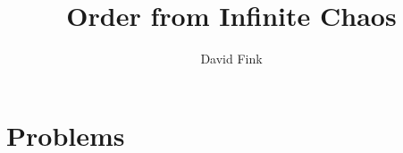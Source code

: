 \documentclass[11pt]{article}
\begin{document}
\title{Order from Infinite Chaos}
\author{David Fink}
\maketitle{}


\section*{Problems}

\newcommand{\src}{\tmpdir/my_cppFromLaTeX.cpp}
\newcommand{\exe}{\tmpdir/my_cppExeFromLaTeX.runme}
\end{document}
